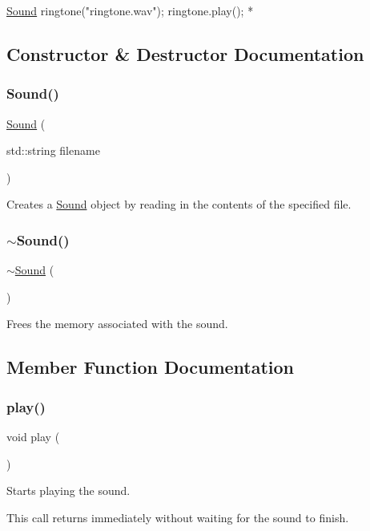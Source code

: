 \begin{DoxyPre}
     \mbox{\hyperlink{classSound}{Sound}} ringtone("ringtone.wav");
     ringtone.play();
*\end{DoxyPre}
 

\subsection{Constructor \& Destructor Documentation}
\mbox{\label{classSound_abc4f1c2a277d6731194905a54294c7ba}} 
\subsubsection{\texorpdfstring{Sound()}{Sound()}}
{\footnotesize\ttfamily \mbox{\hyperlink{classSound}{Sound}} (\begin{DoxyParamCaption}\item[{std\+::string}]{filename }\end{DoxyParamCaption})}



Creates a {\ttfamily \mbox{\hyperlink{classSound}{Sound}}} object by reading in the contents of the specified file. 

\mbox{\label{classSound_ac34f0a5b7e2e11c053df62714aff04fa}} 
\subsubsection{\texorpdfstring{$\sim$\+Sound()}{~Sound()}}
{\footnotesize\ttfamily $\sim$\mbox{\hyperlink{classSound}{Sound}} (\begin{DoxyParamCaption}{ }\end{DoxyParamCaption})\hspace{0.3cm}{\ttfamily [virtual]}}



Frees the memory associated with the sound. 



\subsection{Member Function Documentation}
\mbox{\label{classSound_a6d58098c6cf63c241ed03bc797256bb1}} 
\subsubsection{\texorpdfstring{play()}{play()}}
{\footnotesize\ttfamily void play (\begin{DoxyParamCaption}{ }\end{DoxyParamCaption})}



Starts playing the sound. 

This call returns immediately without waiting for the sound to finish. 